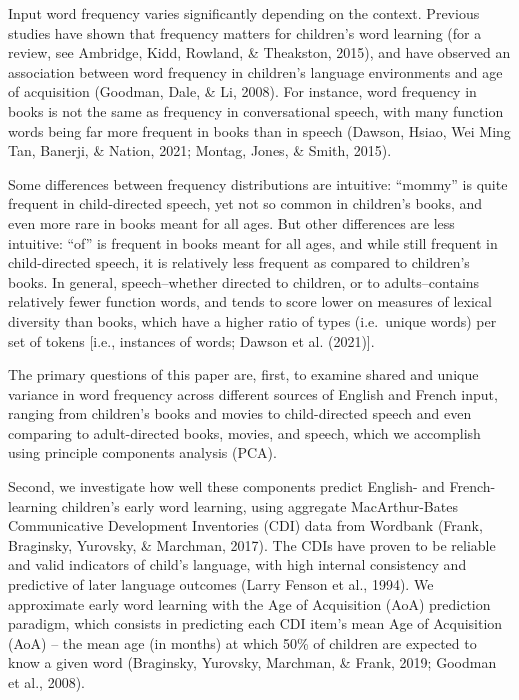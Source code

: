 \documentclass[10pt, letterpaper]{article}
\begin{document}
Input word frequency varies significantly depending on the context.
Previous studies have shown that frequency matters for children's word
learning (for a review, see Ambridge, Kidd, Rowland, \& Theakston,
2015), and have observed an association between word frequency in
children's language environments and age of acquisition (Goodman, Dale,
\& Li, 2008). For instance, word frequency in books is not the same as
frequency in conversational speech, with many function words being far
more frequent in books than in speech (Dawson, Hsiao, Wei Ming Tan,
Banerji, \& Nation, 2021; Montag, Jones, \& Smith, 2015).

Some differences between frequency distributions are intuitive:
``mommy'' is quite frequent in child-directed speech, yet not so common
in children's books, and even more rare in books meant for all ages. But
other differences are less intuitive: ``of'' is frequent in books meant
for all ages, and while still frequent in child-directed speech, it is
relatively less frequent as compared to children's books. In general,
speech--whether directed to children, or to adults--contains relatively
fewer function words, and tends to score lower on measures of lexical
diversity than books, which have a higher ratio of types (i.e.~unique
words) per set of tokens {[}i.e., instances of words; Dawson et al.
(2021){]}.

The primary questions of this paper are, first, to examine shared and
unique variance in word frequency across different sources of English
and French input, ranging from children's books and movies to
child-directed speech and even comparing to adult-directed books,
movies, and speech, which we accomplish using principle components
analysis (PCA).

Second, we investigate how well these components predict English- and
French-learning children's early word learning, using aggregate
MacArthur-Bates Communicative Development Inventories (CDI) data from
Wordbank (Frank, Braginsky, Yurovsky, \& Marchman, 2017). The CDIs have
proven to be reliable and valid indicators of child's language, with
high internal consistency and predictive of later language outcomes
(Larry Fenson et al., 1994). We approximate early word learning with the
Age of Acquisition (AoA) prediction paradigm, which consists in
predicting each CDI item's mean Age of Acquisition (AoA) -- the mean age
(in months) at which 50\% of children are expected to know a given word
(Braginsky, Yurovsky, Marchman, \& Frank, 2019; Goodman et al., 2008).
\end{document}
